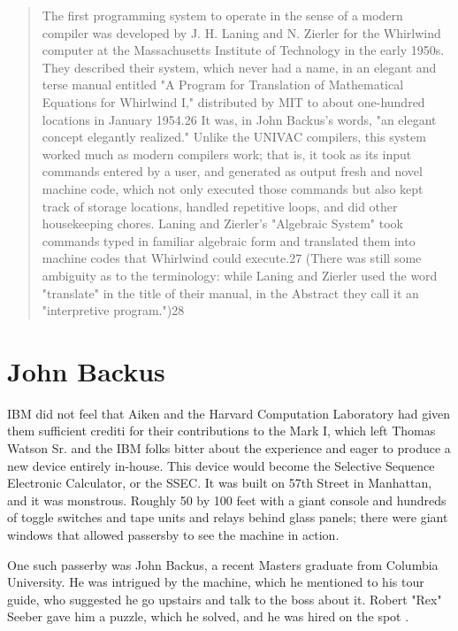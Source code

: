 \begin{quotation}
The first programming system to operate in the sense of a modern compiler was 
developed by J. H. Laning and N. Zierler for the Whirlwind computer at the 
Massachusetts Institute of Technology in the early 1950s. They described their 
system, which never had a name, in an elegant and terse manual entitled "A 
Program for Translation of Mathematical Equations for Whirlwind I," distributed 
by MIT to about one-hundred locations in January 1954.26 It was, in John 
Backus's words, "an elegant concept elegantly realized." Unlike the UNIVAC 
compilers, this system worked much as modern compilers work; that is, it took 
as its input commands entered by a user, and generated as output fresh and 
novel machine code, which not only executed those commands but also kept track 
of storage locations, handled repetitive loops, and did other housekeeping 
chores. Laning and Zierler's "Algebraic System" took commands typed in familiar 
algebraic form and translated them into machine codes that Whirlwind could 
execute.27 (There was still some ambiguity as to the terminology: while Laning 
and Zierler used the word "translate" in the title of their manual, in the 
Abstract they call it an "interpretive program.")28
\cite{new-history-of-modern-computing}
\end{quotation}

\section{John Backus}

IBM did not feel that Aiken and the Harvard Computation Laboratory had
given them sufficient crediti for their contributions to the Mark I,
which left Thomas Watson Sr. and the IBM folks bitter about the experience
and eager to produce a new device entirely in-house.
This device would become the Selective Sequence Electronic Calculator, or the SSEC.
It was built on 57th Street in Manhattan, and it was monstrous.
Roughly 50 by 100 feet with a giant console and hundreds of toggle switches and
tape units and relays behind glass panels; there were giant windows that allowed
passersby to see the machine in action.

One such passerby was John Backus, a recent Masters graduate from Columbia University.
He was intrigued by the machine, which he mentioned to his tour guide,
who suggested he go upstairs and talk to the boss about it.
Robert "Rex" Seeber gave him a puzzle, which he solved, and he was hired on the spot
\cite{backus_oral_history_2006}.

